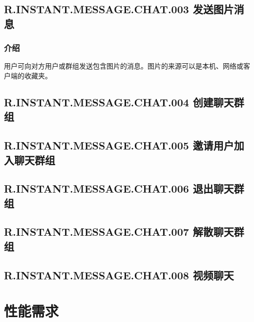 	
\subsection{R.INSTANT.MESSAGE.CHAT.003 发送图片消息}
\subsubsection{介绍}
用户可向对方用户或群组发送包含图片的消息。图片的来源可以是本机、网络或客户端的收藏夹。

\subsection{R.INSTANT.MESSAGE.CHAT.004 创建聊天群组}
\subsection{R.INSTANT.MESSAGE.CHAT.005 邀请用户加入聊天群组}
\subsection{R.INSTANT.MESSAGE.CHAT.006 退出聊天群组}
\subsection{R.INSTANT.MESSAGE.CHAT.007 解散聊天群组}

\subsection{R.INSTANT.MESSAGE.CHAT.008 视频聊天}




\section{性能需求}

